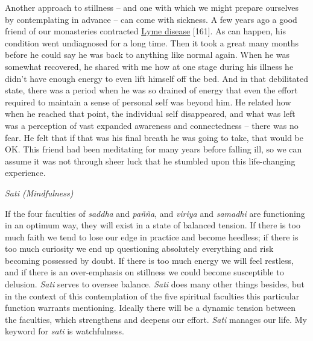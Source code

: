 Another approach to stillness -- and one with which we might prepare
ourselves by contemplating in advance -- can come with sickness. A few
years ago a good friend of our monasteries contracted
\href{https://www.nhs.uk/conditions/lyme-disease/}{\underline{Lyme}
\underline{disease}} {[}161{]}. As can happen, his condition went
undiagnosed for a long time. Then it took a great many months before he
could say he was back to anything like normal again. When he was
somewhat recovered, he shared with me how at one stage during his
illness he didn't have enough energy to even lift himself off the bed.
And in that debilitated state, there was a period when he was so drained
of energy that even the effort required to maintain a sense of personal
self was beyond him. He related how when he reached that point, the
individual self disappeared, and what was left was a perception of vast
expanded awareness and connectedness -- there was no fear. He felt that
if that was his final breath he was going to take, that would be OK.
This friend had been meditating for many years before falling ill, so we
can assume it was not through sheer luck that he stumbled upon this
life-changing experience.

\emph{Sati (Mindfulness)}

If the four faculties of \emph{saddha} and \emph{pañña}, and
\emph{viriya} and \emph{samadhi} are functioning in an optimum way, they
will exist in a state of balanced tension. If there is too much faith we
tend to lose our edge in practice and become heedless; if there is too
much curiosity we end up questioning absolutely everything and risk
becoming possessed by doubt. If there is too much energy we will feel
restless, and if there is an over-emphasis on stillness we could become
susceptible to delusion. \emph{Sati} serves to oversee balance.
\emph{Sati} does many other things besides, but in the context of this
contemplation of the five spiritual faculties this particular function
warrants mentioning. Ideally there will be a dynamic tension between the
faculties, which strengthens and deepens our effort. \emph{Sati} manages
our life. My keyword for \emph{sati} is watchfulness.

